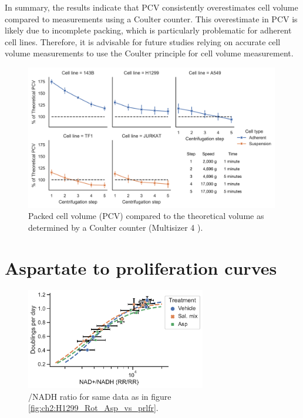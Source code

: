 In summary, the results indicate that PCV consistently overestimates cell volume compared to measurements using a Coulter counter.
This overestimate in PCV is likely due to incomplete packing, which is particularly problematic for adherent cell lines.
Therefore, it is advisable for future studies relying on accurate cell volume measurements to use the Coulter principle for cell volume measurement.

\begin{figure}[ht]
    \centering
    \includegraphics[width=0.99\textwidth]{figures/chap2/app/CCvsPCV.pdf}
    \caption[Packed cell volume vs. Coulter counter]{
    Packed cell volume (PCV) compared to the theoretical volume as determined by a Coulter counter (Multisizer 4 ).
    }
    \label{fig:app_ch2:CCvsPCV}
\end{figure}






\section{Aspartate to proliferation curves}



\begin{figure}
    \centering
    \includegraphics[width=0.7\textwidth]{figures/chap2/app/H1299_Rot_NAD_vs_prlfr_noPyr.pdf}
    \caption[ggggg]{
    \NAD{}/NADH ratio for same data as in figure \ref{fig:ch2:H1299_Rot_Asp_vs_prlfr}.
    }
    \label{fig:app_ch2:H1299_Rot_NAD_vs_prlfr}
\end{figure}


